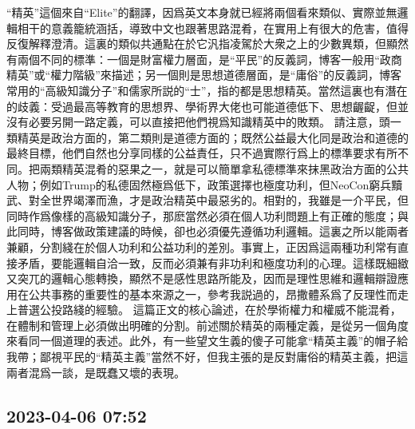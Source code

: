\documentclass[twocolumn]{ctexart}
\begin{document}
“精英”這個來自“Elite”的翻譯，因爲英文本身就已經將兩個看來類似、實際並無邏輯相干的意義籠統涵括，導致中文也跟著思路混肴，在實用上有很大的危害，值得反復解釋澄清。這裏的類似共通點在於它汎指凌駕於大衆之上的少數異類，但顯然有兩個不同的標準：一個是財富權力層面，是“平民”的反義詞，博客一般用“政商精英”或“權力階級”來描述；另一個則是思想道德層面，是“庸俗”的反義詞，博客常用的“高級知識分子”和儒家所説的“士”，指的都是思想精英。當然這裏也有潛在的歧義：受過最高等教育的思想界、學術界大佬也可能道德低下、思想齷齪，但並沒有必要另開一路定義，可以直接把他們視爲知識精英中的敗類。
請注意，頭一類精英是政治方面的，第二類則是道德方面的；既然公益最大化同是政治和道德的最終目標，他們自然也分享同樣的公益責任，只不過實際行爲上的標準要求有所不同。把兩類精英混肴的惡果之一，就是可以簡單拿私德標準來抹黑政治方面的公共人物；例如Trump的私德固然極爲低下，政策選擇也極度功利，但NeoCon窮兵黷武、對全世界竭澤而漁，才是政治精英中最惡劣的。相對的，我雖是一介平民，但同時作爲像樣的高級知識分子，那麽當然必須在個人功利問題上有正確的態度；與此同時，博客做政策建議的時候，卻也必須優先遵循功利邏輯。這裏之所以能兩者兼顧，分割綫在於個人功利和公益功利的差別。事實上，正因爲這兩種功利常有直接矛盾，要能邏輯自洽一致，反而必須兼有非功利和極度功利的心理。這樣既細緻又突兀的邏輯心態轉換，顯然不是感性思路所能及，因而是理性思維和邏輯辯證應用在公共事務的重要性的基本來源之一，參考我説過的，昂撒體系爲了反理性而走上普選公投路綫的經驗。
這篇正文的核心論述，在於學術權力和權威不能混肴，在體制和管理上必須做出明確的分割。前述關於精英的兩種定義，是從另一個角度來看同一個道理的表述。此外，有一些望文生義的傻子可能拿“精英主義”的帽子給我帶；鄙視平民的“精英主義”當然不好，但我主張的是反對庸俗的精英主義，把這兩者混爲一談，是既蠢又壞的表現。
\subsection*{2023-04-06 07:52}
\end{document}
